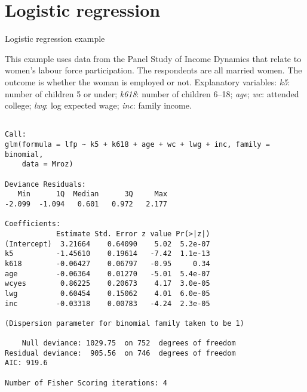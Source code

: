 \documentclass[10pt,ignorenonframetext,]{beamer}
\begin{document}
\section{Logistic regression}\label{logistic-regression}

\begin{frame}[fragile]{Logistic regression example}

\scriptsize
This example uses data from the Panel Study of Income Dynamics that
relate to women's labour force participation. The respondents are all
married women. The outcome is whether the woman is employed or not.
Explanatory variables: \emph{k5}: number of children 5 or under;
\emph{k618}: number of children 6--18; \emph{age}; \emph{wc}: attended
college; \emph{lwg}: log expected wage; \emph{inc}: family income.

\begin{verbatim}

Call:
glm(formula = lfp ~ k5 + k618 + age + wc + lwg + inc, family = binomial,
    data = Mroz)

Deviance Residuals:
   Min      1Q  Median      3Q     Max
-2.099  -1.094   0.601   0.972   2.177

Coefficients:
            Estimate Std. Error z value Pr(>|z|)
(Intercept)  3.21664    0.64090    5.02  5.2e-07
k5          -1.45610    0.19614   -7.42  1.1e-13
k618        -0.06427    0.06797   -0.95     0.34
age         -0.06364    0.01270   -5.01  5.4e-07
wcyes        0.86225    0.20673    4.17  3.0e-05
lwg          0.60454    0.15062    4.01  6.0e-05
inc         -0.03318    0.00783   -4.24  2.3e-05

(Dispersion parameter for binomial family taken to be 1)

    Null deviance: 1029.75  on 752  degrees of freedom
Residual deviance:  905.56  on 746  degrees of freedom
AIC: 919.6

Number of Fisher Scoring iterations: 4
\end{verbatim}

\end{frame}
\end{document}
